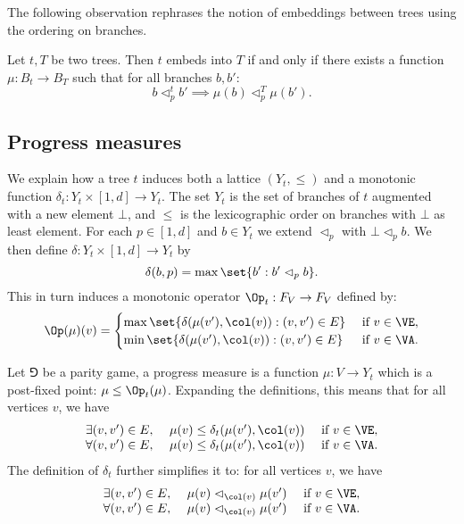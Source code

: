 The following observation rephrases the notion of embeddings between trees using the ordering on branches.

\begin{fact}
\label{3-fact:embedding}
Let $t,T$ be two trees.
Then $t$ embeds into $T$ if and only if there exists a function $\mu : B_t \to B_T$
such that for all branches $b,b'$:
\[
b \vartriangleleft_p^t b' \implies \mu(b) \vartriangleleft_p^T \mu(b').
\]
\end{fact}

\subsection*{Progress measures}
We explain how a tree $t$ induces both a lattice $(Y_t,\le)$ and a monotonic function $\delta_t : Y_t \times [1,d] \to Y_t$.
The set $Y_t$ is the set of branches of $t$ augmented with a new element $\bot$, 
and $\le$ is the lexicographic order on branches with $\bot$ as least element.
For each $p \in [1,d]$ and $b \in Y_t$ we extend $\vartriangleleft_p$ with $\bot \vartriangleleft_p b$.
We then define $\delta : Y_t \times [1,d] \to Y_t$ by
\[
\delta(b,p) = \max \set{b' : b' \vartriangleleft_p b}.
\]
This in turn induces a monotonic operator $\Op_t : F_V \to F_V$ defined by:
\[
\Op(\mu)(v) = 
\begin{cases}
\max \set{\delta( \mu(v'), \col(v)) : (v,v') \in E} & \text{ if } v \in \VE, \\
\min \set{\delta( \mu(v'), \col(v)) : (v,v') \in E} & \text{ if } v \in \VA.
\end{cases}
\]

Let $\Game$ be a parity game, a progress measure is a function $\mu : V \to Y_t$ which is a post-fixed point: $\mu \le \Op_t(\mu)$. 
Expanding the definitions, this means that for all vertices $v$, we have
\[
\begin{array}{llll}
\exists (v,v') \in E,\ & \mu(v) \le \delta_t( \mu(v'), \col(v)) & \text{ if } v \in \VE, \\
\forall (v,v') \in E,\ & \mu(v) \le \delta_t( \mu(v'), \col(v)) & \text{ if } v \in \VA.
\end{array}
\]
The definition of $\delta_t$ further simplifies it to: for all vertices $v$, we have
\[
\begin{array}{llll}
\exists (v,v') \in E,\ & \mu(v) \vartriangleleft_{\col(v)} \mu(v') & \text{ if } v \in \VE, \\
\forall (v,v') \in E,\ & \mu(v) \vartriangleleft_{\col(v)} \mu(v') & \text{ if } v \in \VA.
\end{array}
\]

